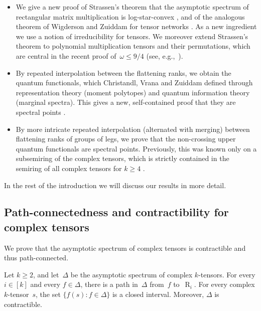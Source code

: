 \documentclass[11pt,letterpaper]{article}
\DeclareMathOperator{\tensorrank}{R}
\begin{document}
\begin{itemize}
\item  We give a new proof of Strassen's theorem that the asymptotic spectrum of rectangular matrix multiplication is log-star-convex \cite[Corollary~6.6]{strassen1988asymptotic}, and of the analogous theorem of Wigderson and Zuiddam for tensor networks \cite[Theorem~12.23]{wigderson2022asymptotic}. As a new ingredient we use a notion of irreducibility for tensors. We moreover extend Strassen's theorem to polynomial multiplication tensors and their permutations, which are central in the recent proof of~\(\omega\leq9/4\) \cite{OAI:Matrix-Multiplication-Nine-Fourths-October-2-2026} (see, e.g.,~\cite{amanov2026multiplyingmatricespolynomialsexposition,shpilka2026exposition}). \item By repeated interpolation between the flattening ranks, we obtain the quantum functionals, which Christandl, Vrana and Zuiddam \cite{MR4495838} defined through representation theory (moment polytopes) and quantum information theory (marginal spectra). This gives a new, self-contained proof that they are spectral points \cite[Corollary~3.31]{MR4495838}.
\item By more intricate repeated interpolation (alternated with merging) between flattening ranks of groups of legs, we prove that the non-crossing upper quantum functionals \cite[Definition~3.14]{MR4495838} are spectral points. Previously, this was known only on a subsemiring of the complex tensors, which is strictly contained in the semiring of all complex tensors for \(k\geq4\) \cite[Proposition~4.2 and Theorem~3.1]{botero2026quantumfunctionalshigherordertensors}.
\end{itemize}
In the rest of the introduction we will discuss our results in more detail.

\subsection{Path-connectedness and contractibility for complex tensors}

We prove that the asymptotic spectrum of complex tensors is contractible and thus path-connected.

\begin{theorem}\label{th:intro-complex}
Let \(k\geq2\), and let~\(\Delta\) be the asymptotic spectrum of complex \(k\)-tensors. For every \(i\in[k]\) and every \(f\in\Delta\), there is a path in~\(\Delta\) from~\(f\) to~\(\tensorrank_i\). For every complex \(k\)-tensor~\(s\), the set \(\{f(s):f\in\Delta\}\) is a closed interval. Moreover, \(\Delta\) is contractible.
\end{theorem}
\end{document}
